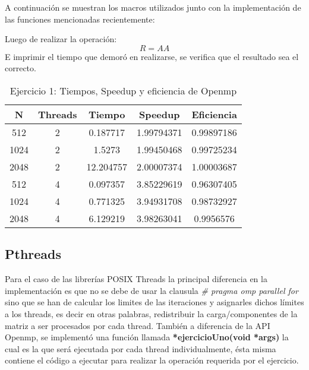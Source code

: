A continuación se muestran los macros utilizados junto con la implementación de las funciones mencionadas recientemente:


Luego de realizar la operación: $$R = AA$$ E imprimir el tiempo que demoró en realizarse, se verifica que el resultado sea el correcto.


\begin{table}[htbp]
\centering
\caption{Ejercicio 1: Tiempos, Speedup y eficiencia de Openmp}
\begin{tabular}{|c|c|c|c|c|}
\hline
\textbf{N} & \textbf{Threads} & \textbf{Tiempo} & \textbf{Speedup} & \textbf{Eficiencia} \\ \hline
512        & 2                & 0.187717        & 1.99794371       & 0.99897186          \\ \hline
1024       & 2                & 1.5273          & 1.99450468       & 0.99725234          \\ \hline
2048       & 2                & 12.204757       & 2.00007374       & 1.00003687          \\ \hline
512        & 4                & 0.097357        & 3.85229619       & 0.96307405          \\ \hline
1024       & 4                & 0.771325        & 3.94931708       & 0.98732927          \\ \hline
2048       & 4                & 6.129219        & 3.98263041       & 0.9956576           \\ \hline
\end{tabular}
\end{table}

\subsection{Pthreads}

Para el caso de las librerías POSIX Threads la principal diferencia en la implementación es que no se debe de usar la clausula \textit{\# pragma omp parallel for} sino que se han de calcular los limites de las iteraciones y asignarles dichos límites a los threads, es decir en otras palabras, redistribuir la carga/componentes de la matriz a ser procesados por cada thread. También a diferencia de la API Openmp, se implementó una función llamada \textbf{*ejercicioUno(void *args)} la cual es la que será ejecutada por cada thread individualmente, ésta misma contiene el código a ejecutar para realizar la operación requerida por el ejercicio.


